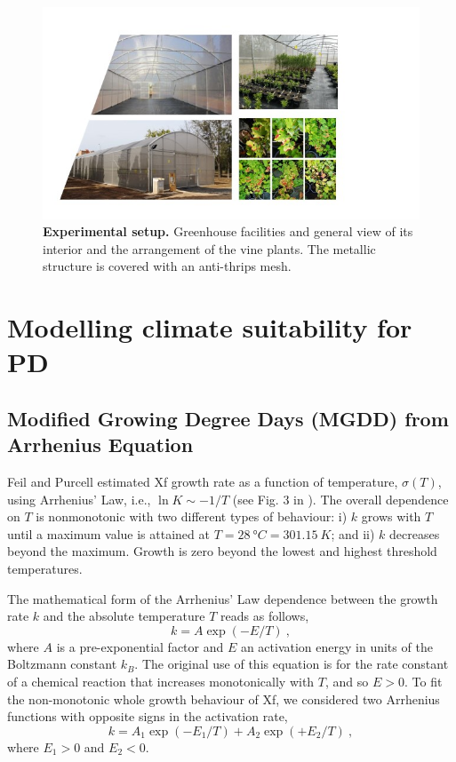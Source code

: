 \begin{figure}[H]
    \centering
    \includegraphics[width=\textwidth]{Figures/Experimental setup.jpg}
    \caption[Experimental setup]{\textbf{Experimental setup.} Greenhouse
        facilities and general
        view of its interior and the arrangement of the vine plants. The
        metallic
        structure is covered with an anti-thrips mesh.}
    \label{fig:experimental_setup} %
\end{figure}

\section{Modelling climate suitability for PD}\label{app:S2}
\subsection{Modified Growing Degree Days (MGDD) from Arrhenius
    Equation}\label{app:MGDD} %

Feil and Purcell estimated Xf growth rate as a function of temperature,
$\sigma(T)$, using Arrhenius’ Law, i.e., $\ln K \sim -1/T$ (see Fig. 3 in
\cite{Feil2001}). The overall dependence on $T$ is nonmonotonic with two
different types of behaviour: i) $k$ grows with $T$ until a maximum value is
attained at $T=\SI{28}{\degree C}=\SI{301.15}{K}$; and ii) $k$ decreases beyond
the maximum. Growth is zero beyond the lowest and highest threshold
temperatures.

The mathematical form of the Arrhenius' Law dependence between the growth
rate $k$ and the absolute temperature $T$ reads as follows,
\begin{equation}
    k = A \exp(-E/T) \ ,
\end{equation}
where $A$ is a pre-exponential factor and $E$ an activation energy in units
of the Boltzmann constant $k_B$. The original use of this equation is for the
rate constant of a chemical reaction that increases monotonically with $T$, and
so $E>0$.  To fit the non-monotonic whole growth behaviour of Xf, we considered
two Arrhenius functions with opposite signs in the activation rate,
\begin{equation}\label{eq: Arrhenius_2}
    k =A_1 \exp(-E_1/T) + A_2 \exp(+E_2/T) \ ,
\end{equation}
where $E_1>0$ and $E_2<0$.\\

